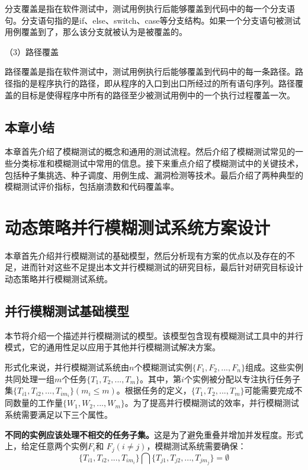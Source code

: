 \documentclass[master]{thesis-uestc}
\begin{document}
分支覆盖是指在软件测试中，测试用例执行后能够覆盖到代码中的每一个分支语句。分支语句指的是if、else、switch、case等分支结构。如果一个分支语句被测试用例覆盖到了，那么该分支就被认为是被覆盖的。

（3）路径覆盖

路径覆盖是指在软件测试中，测试用例执行后能够覆盖到代码中的每一条路径。路径指的是程序执行的路径，即从程序的入口到出口所经过的所有语句序列。路径覆盖的目标是使得程序中所有的路径至少被测试用例中的一个执行过程覆盖一次。

\section{本章小结}

本章首先介绍了模糊测试的概念和通用的测试流程。然后介绍了模糊测试常见的一些分类标准和模糊测试中常用的信息。接下来重点介绍了模糊测试中的关键技术，包括种子集挑选、种子调度、用例生成、漏洞检测等技术。最后介绍了两种典型的模糊测试评价指标，包括崩溃数和代码覆盖率。

\chapter{动态策略并行模糊测试系统方案设计}

本章首先介绍并行模糊测试的基础模型，然后分析现有方案的优点以及存在的不足，进而针对这些不足提出本文并行模糊测试的研究目标，最后针对研究目标设计动态策略并行模糊测试系统。

\section{并行模糊测试基础模型}
本节将介绍一个描述并行模糊测试的模型。该模型包含现有模糊测试工具中的并行模式，它的通用性足以应用于其他并行模糊测试解决方案。

形式化来说，并行模糊测试系统由$n$个模糊测试实例$\{F_1, F_2, ..., F_n \}$组成。这些实例共同处理一组$m$个任务$\{T_1, T_2, ..., T_m \}$。其中，第$i$个实例被分配以专注执行任务子集$\{T_{i1}, T_{i2}, ..., T_{im_i}\}(m_i \leq m)$。根据任务的定义，$\{T_1, T_2, ..., T_m \}$可能需要完成不同数量的工作量$\{W_1, W_2, ..., W_m \}$。为了提高并行模糊测试的效率，并行模糊测试系统需要满足以下三个属性。

\textbf{不同的实例应该处理不相交的任务子集。}这是为了避免重叠并增加并发程度。形式上，给定任意两个实例$F_i$和 $F_j (i \neq j)$，模糊测试系统需要确保：
\begin{equation}
\{T_{i1}, T_{i2}, ..., T_{im_i}\} \bigcap \{T_{j1}, T_{j2}, ..., T_{jm_j}\} = \emptyset
\label{eq1}
\end{equation}
\end{document}
